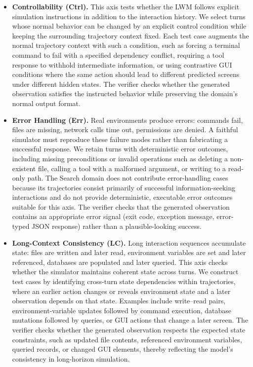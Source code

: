 \begin{itemize}[leftmargin=1.5em,itemsep=2pt]
    \item \textbf{Controllability (Ctrl).}
    This axis tests whether the LWM follows explicit simulation instructions in addition to the interaction history.
    We select turns whose normal behavior can be changed by an explicit control condition while keeping the surrounding trajectory context fixed.
    Each test case augments the normal trajectory context with such a condition, such as forcing a terminal command to fail with a specified dependency conflict, requiring a tool response to withhold intermediate information, or using contrastive GUI conditions where the same action should lead to different predicted screens under different hidden states.
    The verifier checks whether the generated observation satisfies the instructed behavior while preserving the domain's normal output format.

    \item \textbf{Error Handling (Err).}
    Real environments produce errors: commands fail, files are missing, network calls time out, permissions are denied.
    A faithful simulator must reproduce these failure modes rather than fabricating a successful response.
    We retain turns with deterministic error outcomes, including missing preconditions or invalid operations such as deleting a non-existent file, calling a tool with a malformed argument, or writing to a read-only path.
    The Search domain does not contribute error-handling cases because its trajectories consist primarily of successful information-seeking interactions and do not provide deterministic, executable error outcomes suitable for this axis.
    The verifier checks that the generated observation contains an appropriate error signal (exit code, exception message, error-typed JSON response) rather than a plausible-looking success.

    \item \textbf{Long-Context Consistency (LC).}
    Long interaction sequences accumulate state: files are written and later read, environment variables are set and later referenced, databases are populated and later queried.
    This axis checks whether the simulator maintains coherent state across turns.
    We construct test cases by identifying cross-turn state dependencies within trajectories, where an earlier action changes or reveals environment state and a later observation depends on that state.
    Examples include write--read pairs, environment-variable updates followed by command execution, database mutations followed by queries, or GUI actions that change a later screen.
    The verifier checks whether the generated observation respects the expected state constraints, such as updated file contents, referenced environment variables, queried records, or changed GUI elements, thereby reflecting the model's consistency in long-horizon simulation.
\end{itemize}

